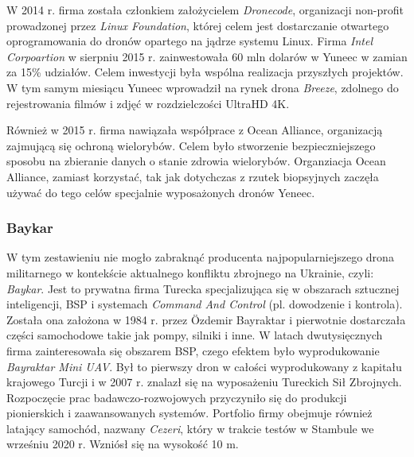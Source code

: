 W 2014 r. firma została członkiem założycielem \textit{Dronecode}, organizacji non-profit prowadzonej przez \textit{Linux Foundation}, której celem jest dostarczanie otwartego oprogramowania do dronów opartego na jądrze systemu Linux. Firma \textit{Intel Corpoartion} w sierpniu 2015 r. zainwestowała 60 mln dolarów w Yuneec w zamian za 15\% udziałów. Celem inwestycji była wspólna realizacja przyszłych projektów. W tym samym miesiącu Yuneec wprowadził na rynek drona \textit{Breeze}, zdolnego do rejestrowania filmów i zdjęć w rozdzielczości UltraHD 4K. 

Również w 2015 r. firma nawiązała współprace z Ocean Alliance, organizacją zajmującą się ochroną wielorybów. Celem było stworzenie bezpieczniejszego sposobu na zbieranie danych o stanie zdrowia wielorybów. Organziacja Ocean Alliance, zamiast korzystać, tak jak dotychczas z rzutek biopsyjnych zaczęła używać do tego celów specjalnie wyposażonych dronów Yeneec.\cite{yuneec-wiki}

\subsubsection{Baykar}

W tym zestawieniu nie mogło zabraknąć producenta najpopularniejszego drona militarnego w kontekście aktualnego konfliktu zbrojnego na Ukrainie, czyli: \textit{Baykar}. Jest to prywatna firma Turecka specjalizująca się w obszarach sztucznej inteligencji, BSP i systemach \textit{Command And Control} (pl. dowodzenie i kontrola). Została ona założona w 1984 r. przez Özdemir Bayraktar i pierwotnie dostarczała części samochodowe takie jak pompy, silniki i inne. W latach dwutysięcznych firma zainteresowała się obszarem BSP, czego efektem było wyprodukowanie \textit{Bayraktar Mini UAV}. Był to pierwszy dron w całości wyprodukowany z kapitału krajowego Turcji i w 2007 r. znalazł się na wyposażeniu Tureckich Sił Zbrojnych. Rozpoczęcie prac badawczo-rozwojowych przyczyniło się do produkcji pionierskich i zaawansowanych systemów. Portfolio firmy obejmuje również latający samochód, nazwany \textit{Cezeri}, który w trakcie testów w Stambule we wrześniu 2020 r. Wzniósł się na wysokość 10 m.\cite{baykar-wiki}

